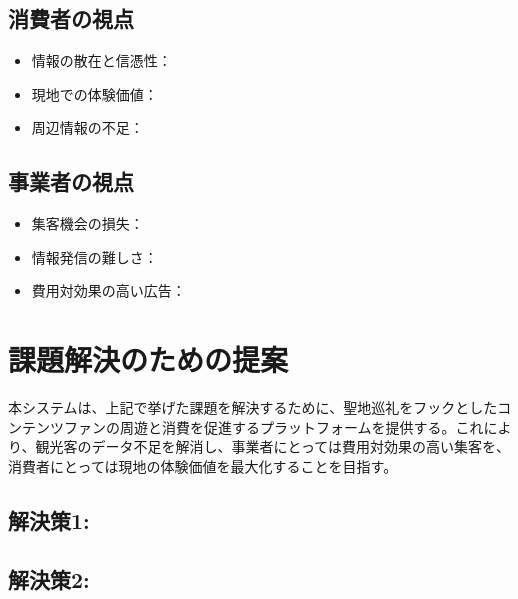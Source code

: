 \documentclass[a4j, 11pt, report]{jsarticle}
\begin{document}
\subsection{消費者の視点}
\begin{itemize}
    \item 情報の散在と信憑性：
    \item 現地での体験価値：
    \item 周辺情報の不足：
\end{itemize}


\subsection{事業者の視点}
\begin{itemize}
    \item 集客機会の損失：
    \item 情報発信の難しさ：
    \item 費用対効果の高い広告：
\end{itemize}

\section{課題解決のための提案}

本システムは、上記で挙げた課題を解決するために、聖地巡礼をフックとしたコンテンツファンの周遊と消費を促進するプラットフォームを提供する。これにより、観光客のデータ不足を解消し、事業者にとっては費用対効果の高い集客を、消費者にとっては現地の体験価値を最大化することを目指す。



\subsection{解決策1: }

\subsection{解決策2: }

\end{document}
